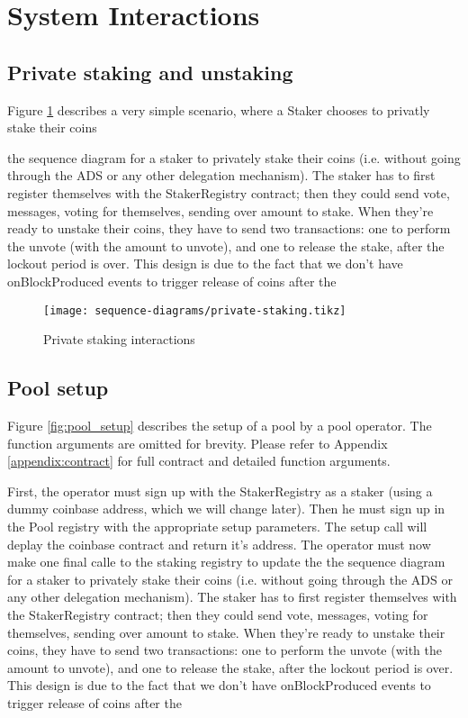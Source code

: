 \section{System Interactions}
\label{appendix:sequence_diagrams}

\subsection{Private staking and unstaking}
Figure \ref{fig:priv_staking} describes a very simple scenario, where a Staker chooses to privatly stake their coins 

the sequence diagram for a staker to privately stake their coins (i.e. without going through the ADS or any other delegation mechanism).  The staker has to first register themselves with the StakerRegistry contract; then they could send vote, messages, voting for themselves, sending over amount to stake. When they're ready to unstake their coins, they have to send two transactions: one to perform the unvote (with the amount to unvote), and one to release the stake, after the lockout period is over. This design is due to the fact that we don't have onBlockProduced events to trigger release of coins after the 

\begin{figure}[ht]
\centering
\texttt{[image: sequence-diagrams/private-staking.tikz]}
\caption{Private staking interactions}
\label{fig:priv_staking}
\end{figure}
\clearpage

\subsection{Pool setup}
Figure \ref{fig:pool_setup} describes the setup of a pool by a pool operator. The function arguments are omitted for brevity. Please refer to Appendix \ref{appendix:contract} for full contract and detailed function arguments. 

First, the operator must sign up with the StakerRegistry as a staker (using a dummy coinbase address, which we will change later). Then he must sign up in the Pool registry with  the appropriate setup parameters. The setup call will deplay the coinbase contract and return it's address. The operator must now make one final calle to the staking registry to update the  
the sequence diagram for a staker to privately stake their coins (i.e. without going through the ADS or any other delegation mechanism).  The staker has to first register themselves with the StakerRegistry contract; then they could send vote, messages, voting for themselves, sending over amount to stake. When they're ready to unstake their coins, they have to send two transactions: one to perform the unvote (with the amount to unvote), and one to release the stake, after the lockout period is over. This design is due to the fact that we don't have onBlockProduced events to trigger release of coins after the 

